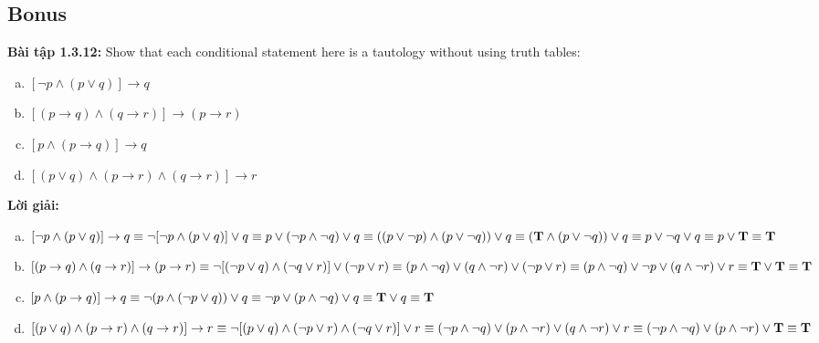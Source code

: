 \documentclass[a4paper]{article}
\begin{document}
\subsection{Bonus}
\textbf{Bài tập 1.3.12:} Show that each conditional statement here is a tautology without using truth tables: 
\begin{enumerate}[a)]
	\item $[\lnot p \land (p \lor q)] \rightarrow q$
	\item $[(p \rightarrow q) \land (q \rightarrow r)] \rightarrow (p \rightarrow r)$
	\item $[p \land (p \rightarrow q)] \rightarrow q$
	\item $[(p \lor q) \land (p \rightarrow r) \land (q \rightarrow r)] \rightarrow r$
\end{enumerate}
\textbf{Lời giải: }
\begin{enumerate}[a)]
	\item $[\lnot p \land (p \lor q)] \rightarrow q \\\equiv \lnot[\lnot p \land (p \lor q)] \lor q \\\equiv p \lor (\lnot p \land \lnot q) \lor q \\\equiv ((p \lor \lnot p) \land (p \lor \lnot q)) \lor q \\\equiv (\textbf{T} \land (p \lor \lnot q))\lor q \\\equiv p \lor \lnot q \lor q \equiv p \lor \textbf{T} \equiv \textbf{T}$
	\item $[(p \rightarrow q) \land (q \rightarrow r)] \rightarrow (p \rightarrow r) \\\equiv \lnot [(\lnot p \lor q) \land (\lnot q \lor r)] \lor (\lnot p \lor r) \\\equiv (p \land \lnot q) \lor (q \land \lnot r) \lor (\lnot p \lor r) \\\equiv (p \land \lnot q)\lor \lnot p \lor (q \land \lnot r) \lor r \\\equiv \textbf{T} \lor \textbf{T} \equiv \textbf{T}$
	\item $[p \land (p \rightarrow q)] \rightarrow q \\\equiv \lnot(p \land (\lnot p \lor q))\lor q \\\equiv \lnot p \lor (p \land \lnot q) \lor q \\\equiv \textbf{T} \lor q \equiv \textbf{T}$
	\item $[(p \lor q) \land (p \rightarrow r) \land (q \rightarrow r)] \rightarrow r \\\equiv \lnot [(p \lor q) \land (\lnot p \lor r) \land (\lnot q \lor r)] \lor r \\\equiv (\lnot p \land \lnot q) \lor (p \land \lnot r) \lor (q \land \lnot r) \lor r \\\equiv (\lnot p \land \lnot q) \lor (p \land \lnot r) \lor \textbf{T} \equiv \textbf{T}$
\end{enumerate}
\clearpage
\end{document}
